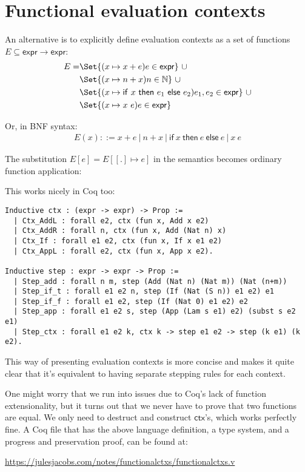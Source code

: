 \documentclass[a4paper, 11pt]{article}
\providecommand\given{} %
\newcommand{\mif}{\mathsf{if}\ }
\newcommand{\mthen}{\ \mathsf{then}\ }
\newcommand{\melse}{\ \mathsf{else}\ }
\begin{document}
\section{Functional evaluation contexts}

An alternative is to explicitly define evaluation contexts as a set of functions $E \subseteq \mathsf{expr} \to \mathsf{expr}$:
\begin{align*}
  E = &\Set{(x \mapsto x + e) \given e \in \mathsf{expr} }\ \cup \\
  &\Set{(x \mapsto n + x) \given n \in \mathbb{N} }\ \cup \\
  &\Set{(x \mapsto \mif x \mthen e_1 \melse e_2) \given e_1,e_2 \in \mathsf{expr} }\ \cup \\
  &\Set{(x \mapsto x\ e) \given e \in \mathsf{expr} }
\end{align*}

Or, in BNF syntax:
\begin{align*}
  E(x) ::= x + e\ |\ n + x\ |\ \mif x \mthen e \melse e\ |\ x\ e
\end{align*}

The substitution $E[e] = E[[.] \mapsto e]$ in the semantics becomes ordinary function application:
\begin{mathpar}
\end{mathpar}

This works nicely in Coq too:
\begin{lstlisting}
Inductive ctx : (expr -> expr) -> Prop :=
  | Ctx_AddL : forall e2, ctx (fun x, Add x e2)
  | Ctx_AddR : forall n, ctx (fun x, Add (Nat n) x)
  | Ctx_If : forall e1 e2, ctx (fun x, If x e1 e2)
  | Ctx_AppL : forall e2, ctx (fun x, App x e2).

Inductive step : expr -> expr -> Prop :=
  | Step_add : forall n m, step (Add (Nat n) (Nat m)) (Nat (n+m))
  | Step_if_t : forall e1 e2 n, step (If (Nat (S n)) e1 e2) e1
  | Step_if_f : forall e1 e2, step (If (Nat 0) e1 e2) e2
  | Step_app : forall e1 e2 s, step (App (Lam s e1) e2) (subst s e2 e1)
  | Step_ctx : forall e1 e2 k, ctx k -> step e1 e2 -> step (k e1) (k e2).
\end{lstlisting}

This way of presenting evaluation contexts is more concise and makes it quite clear that it's equivalent to having separate stepping rules for each context.

One might worry that we run into issues due to Coq's lack of function extensionality, but it turns out that we never have to prove that two functions are equal. We only need to destruct and construct $\mathsf{ctx}$'s, which works perfectly fine. A Coq file that has the above language definition, a type system, and a progress and preservation proof, can be found at:

\begin{center}
  \url{https://julesjacobs.com/notes/functionalctxs/functionalctxs.v}
\end{center}
\end{document}
